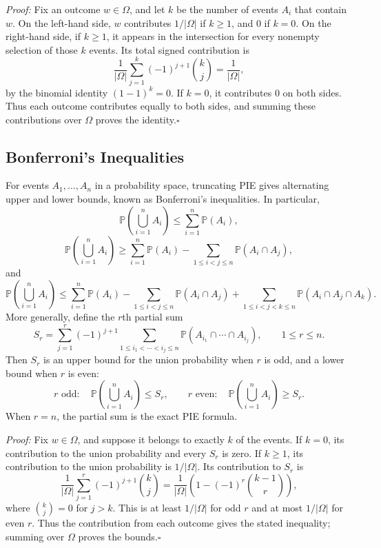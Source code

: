 \documentclass[a4paper,11pt,abstracton]{scrartcl}
\theoremstyle{dotlessP}
\theoremstyle{dotlessS}
\theoremstyle{remark}
\theoremstyle{definition}
\begin{document}
\begin{claim_box}
\textit{Proof:} Fix an outcome $w\in\Omega$, and let $k$ be the number of events $A_i$ that contain $w$. On the left-hand side, $w$ contributes $1/|\Omega|$ if $k\geq 1$, and $0$ if $k=0$. On the right-hand side, if $k\geq 1$, it appears in the intersection for every nonempty selection of those $k$ events. Its total signed contribution is
\[
  \frac{1}{|\Omega|}\sum_{j=1}^{k}(-1)^{j+1}\binom{k}{j}
  =\frac{1}{|\Omega|},
\]
by the binomial identity $(1-1)^k=0$. If $k=0$, it contributes $0$ on both sides. Thus each outcome contributes equally to both sides, and summing these contributions over $\Omega$ proves the identity.\hfill$\square$
\end{claim_box}

\subsection{Bonferroni's Inequalities}

\begin{problem_box}
For events $A_1,\ldots,A_n$ in a probability space, truncating PIE gives alternating upper and lower bounds, known as Bonferroni's inequalities. In particular,
\[
  \mathbb{P}\!\left(\bigcup_{i=1}^{n} A_i\right)
  \leq \sum_{i=1}^{n}\mathbb{P}(A_i),
\]
\[
  \mathbb{P}\!\left(\bigcup_{i=1}^{n} A_i\right)
  \geq \sum_{i=1}^{n}\mathbb{P}(A_i)
  -\sum_{1\leq i<j\leq n}\mathbb{P}(A_i\cap A_j),
\]
and
\[
  \mathbb{P}\!\left(\bigcup_{i=1}^{n} A_i\right)
  \leq \sum_{i=1}^{n}\mathbb{P}(A_i)
  -\sum_{1\leq i<j\leq n}\mathbb{P}(A_i\cap A_j)
  +\sum_{1\leq i<j<k\leq n}\mathbb{P}(A_i\cap A_j\cap A_k).
\]
More generally, define the $r$th partial sum
\[
  S_r=\sum_{j=1}^{r}(-1)^{j+1}
  \sum_{1\leq i_1<\cdots<i_j\leq n}
  \mathbb{P}(A_{i_1}\cap\cdots\cap A_{i_j}),
  \qquad 1\leq r\leq n.
\]
Then $S_r$ is an upper bound for the union probability when $r$ is odd, and a lower bound when $r$ is even:
\[
  r\text{ odd}:\quad \mathbb{P}\!\left(\bigcup_{i=1}^{n}A_i\right)\leq S_r,
  \qquad
  r\text{ even}:\quad \mathbb{P}\!\left(\bigcup_{i=1}^{n}A_i\right)\geq S_r.
\]
When $r=n$, the partial sum is the exact PIE formula.
\end{problem_box}

\begin{claim_box}
\textit{Proof:} Fix $w\in\Omega$, and suppose it belongs to exactly $k$ of the events. If $k=0$, its contribution to the union probability and every $S_r$ is zero. If $k\geq1$, its contribution to the union probability is $1/|\Omega|$. Its contribution to $S_r$ is
\[
  \frac{1}{|\Omega|}\sum_{j=1}^{r}(-1)^{j+1}\binom{k}{j}
  =\frac{1}{|\Omega|}\left(1-(-1)^r\binom{k-1}{r}\right),
\]
where $\binom{k}{j}=0$ for $j>k$. This is at least $1/|\Omega|$ for odd $r$ and at most $1/|\Omega|$ for even $r$. Thus the contribution from each outcome gives the stated inequality; summing over $\Omega$ proves the bounds.\hfill$\square$
\end{claim_box}
\end{document}
